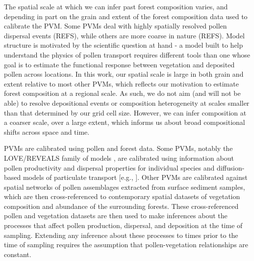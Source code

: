 \documentclass[12pt]{article}
\begin{document}
The spatial scale at which we can infer past forest composition
varies, and depending in part on the grain and extent of the forest
composition data used to calibrate the PVM. Some PVMs deal with highly
spatially resolved pollen dispersal events (REFS), while others are
more coarse in nature (REFS). Model structure is motivated by the
scientific question at hand - a model built to help understand the
physics of pollen transport requires different tools than one whose
goal is to estimate the functional response between vegetation and
deposited pollen across locations. In this work, our spatial scale is
large in both grain and extent relative to most other PVMs, which
reflects our motivation to estimate forest composition at a regional
scale. As such, we do not aim (and will not be able) to resolve
depositional events or composition heterogeneity at scales smaller
than that determined by our grid cell size. However, we can infer
composition at a coarser scale, over a large extent, which informs us
about broad compositional shifts across space and time.

PVMs are calibrated using pollen and forest data. Some PVMs, notably
the LOVE/REVEALS family of models \citep{sugita2007theory1,
  sugita2007theory2}, are calibrated using information about pollen
productivity and dispersal properties for individual species and
diffusion-based models of particulate transport [e.g.,
\citet{prentice1985pollen}]. Other PVMs are calibrated against spatial
networks of pollen assemblages extracted from surface sediment
samples, which are then cross-referenced to contemporary spatial
datasets of vegetation composition and abundance of the surrounding
forests. These cross-referenced pollen and vegetation datasets are
then used to make inferences about the processes that affect pollen
production, dispersal, and deposition at the time of sampling.
Extending any inference about these processes to times prior to the
time of sampling requires the assumption that pollen-vegetation
relationships are constant.
\end{document}
